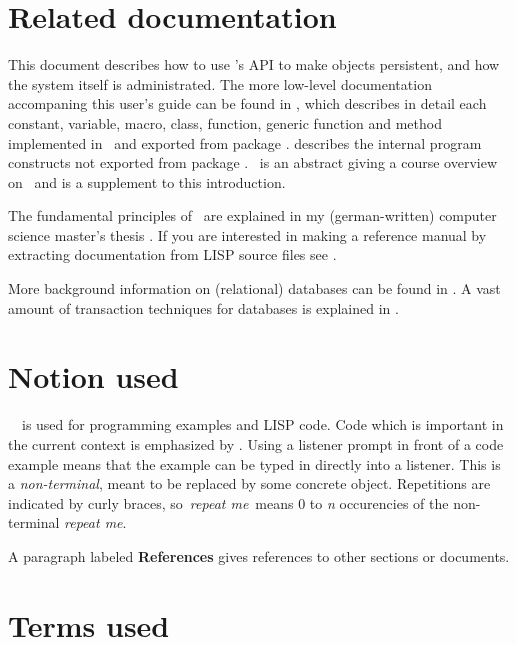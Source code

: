 \section{Related documentation}

This document describes how to use \plobwoexcl's API to make objects
persistent, and how the system itself is administrated.  The more
low-level documentation accompaning this user's guide can be found in
\cite{bib:PLOB-manual}, which describes in detail each constant,
variable, macro, class, function, generic function and method
implemented in \plob\ and exported from package .
\cite{bib:PLOB-internals} describes the internal program constructs
not exported from package .  \cite{bib:Kirschke-95b}\ is an
abstract giving a course overview on \plob\ and is a supplement to
this introduction.

The fundamental principles of \plob\ are explained in my
(german-written) computer science master's thesis
\cite{bib:Kirschke-94a}.  If you are interested in making a reference
manual by extracting documentation from LISP source files see
\cite{bib:LispDoc-Manual}.

More background information on (relational) databases can be found in
\cite{bib:ONeil-94}. A vast amount of transaction techniques for
databases is explained in \cite{bib:Gray-et-al-93}.

\section{Notion used}

\ \ is used for programming examples and
LISP code.  Code which is important
in the current context is emphasized by
\underline{}. Using a listener prompt
\lisp{\listener} in front of a code example means that the example can
be typed in directly into a listener. This is a
\emph{\lt{}non-terminal\gt}, meant to be replaced by some concrete
object. Repetitions are indicated by curly braces, so
\lisp{\{}\,\emph{\lt{}repeat me\gt}\,\lisp{\}} means 0 to \emph{n}
occurencies of the non-terminal \emph{\lt{}repeat me\gt}.

 A paragraph labeled \textbf{References} gives references to
other sections or documents.

\section{Terms used}%
\label{sec:TermsUsed}

